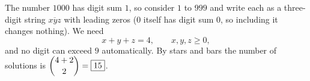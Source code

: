 The number $1000$ has digit sum $1$, so consider $1$ to $999$ and write each as a three-digit string $\overline{xyz}$ with leading zeros ($0$ itself has digit sum $0$, so including it changes nothing). We need
\[
x+y+z=4,\qquad x,y,z\ge0 ,
\]
and no digit can exceed $9$ automatically. By stars and bars the number of solutions is $\dbinom{4+2}{2}=\boxed{15}$.
